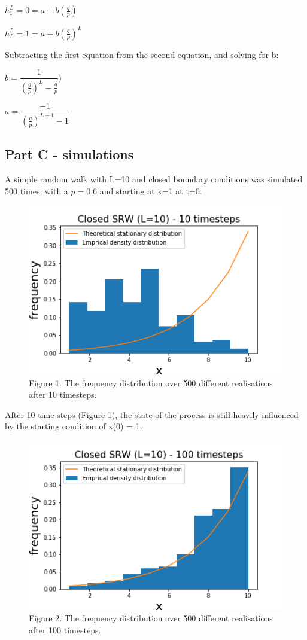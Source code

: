 \documentclass{article}
\begin{document}
$h_1^L = 0 = a + b(\frac{q}{p})$

$h_L^L = 1 = a + b(\frac{q}{p})^L$

Subtracting the first equation from the second equation, and solving for b:

$b = \dfrac{1}{(\frac{q}{p})^{L}-\frac{q}{p}})$

$a = \dfrac{-1}{(\frac{q}{p})^{L-1}-1}$


\subsection{Part C - simulations}

A simple random walk with L=10 and closed boundary conditions was simulated 500 times, with a $p=0.6$ and starting at x=1 at t=0.

\begin{figure}[H]
\includegraphics[scale=1]{10_steps_a.png} 
\small{Figure 1. The frequency distribution over 500 different realisations after 10 timesteps.}
\end{figure}

After 10 time steps (Figure 1), the state of the process is still heavily influenced by the starting condition of x(0) = 1. 

\begin{figure}[H]
\includegraphics[scale=1]{100_steps_a.png} 
\small{Figure 2. The frequency distribution over 500 different realisations after 100 timesteps.}
\end{figure}
\end{document}
